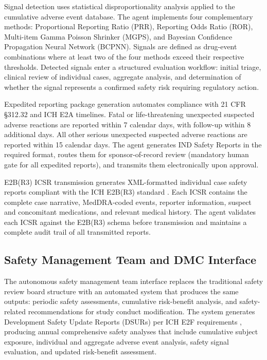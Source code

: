 Signal detection uses statistical disproportionality analysis applied to the cumulative
adverse event database. The agent implements four complementary methods: Proportional
Reporting Ratio (PRR), Reporting Odds Ratio (ROR), Multi-item Gamma Poisson Shrinker
(MGPS), and Bayesian Confidence Propagation Neural Network (BCPNN). Signals are defined
as drug-event combinations where at least two of the four methods exceed their respective
thresholds. Detected signals enter a structured evaluation workflow: initial triage,
clinical review of individual cases, aggregate analysis, and determination of whether the
signal represents a confirmed safety risk requiring regulatory action.

Expedited reporting package generation automates compliance with 21 CFR \S312.32
\cite{cfr-part-312} and ICH E2A timelines. Fatal or life-threatening unexpected suspected
adverse reactions are reported within 7 calendar days, with follow-up within 8 additional
days. All other serious unexpected suspected adverse reactions are reported within 15
calendar days. The agent generates IND Safety Reports in the required format, routes them
for sponsor-of-record review (mandatory human gate for all expedited reports), and
transmits them electronically upon approval.

E2B(R3) ICSR transmission generates XML-formatted individual case safety reports
compliant with the ICH E2B(R3) standard \cite{ich-e2br3}. Each ICSR contains the
complete case narrative, MedDRA-coded events, reporter information, suspect and
concomitant medications, and relevant medical history. The agent validates each ICSR
against the E2B(R3) schema before transmission and maintains a complete audit trail
of all transmitted reports.

\subsection{Safety Management Team and DMC Interface}

The autonomous safety management team interface replaces the traditional safety review
board structure with an automated system that produces the same outputs: periodic safety
assessments, cumulative risk-benefit analysis, and safety-related recommendations for
study conduct modification. The system generates Development Safety Update Reports
(DSURs) per ICH E2F requirements \cite{ich-e2f}, producing annual comprehensive safety
analyses that include cumulative subject exposure, individual and aggregate adverse event
analysis, safety signal evaluation, and updated risk-benefit assessment.

